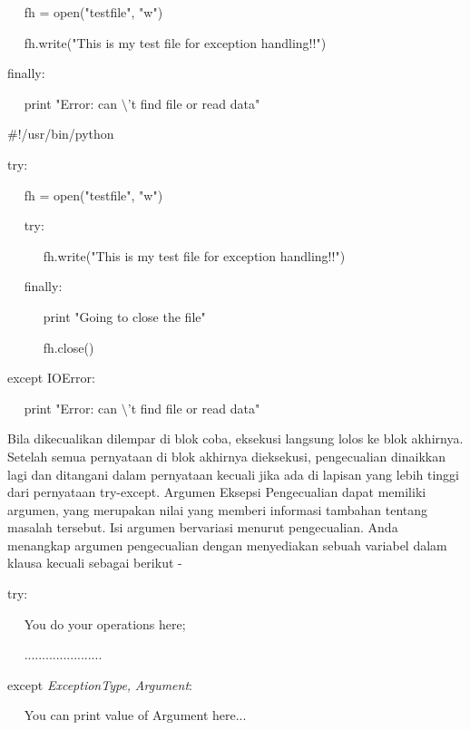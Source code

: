 ~~ fh = open("testfile", "w") 

~~ fh.write("This is my test file for exception handling!!") 
 
finally: 

~~ print "Error: can $  \setminus  $'t find file or read data" 
\vspace{12pt}
\vspace{12pt}
 
 $  \#  $!/usr/bin/python 
\vspace{12pt}
 
try: 

~~ fh = open("testfile", "w") 

~~ try: 
 
~~~~~ fh.write("This is my test file for exception handling!!") 

~~ finally: 

~~~~~ print "Going to close the file" 

~~~~~ fh.close() 

except IOError: 

~~ print "Error: can $  \setminus  $'t find file or read data" 
\vspace{12pt}
\vspace{16pt}

 \hspace*{0.5in} Bila dikecualikan dilempar di blok coba, eksekusi langsung lolos ke blok akhirnya. Setelah semua pernyataan di blok akhirnya dieksekusi, pengecualian dinaikkan lagi dan ditangani dalam pernyataan kecuali jika ada di lapisan yang lebih tinggi dari pernyataan try-except. Argumen Eksepsi Pengecualian dapat memiliki argumen, yang merupakan nilai yang memberi informasi tambahan tentang masalah tersebut. Isi argumen bervariasi menurut pengecualian. Anda menangkap argumen pengecualian dengan menyediakan sebuah variabel dalam klausa kecuali sebagai berikut - 
\vspace{12pt}

try: 

~~ You do your operations here;

~~ ...................... 

except \textit{ExceptionType}\textit{,}\textit{ }\textit{Argument}: 

~~ You can print value of Argument here... 
\vspace{12pt}

